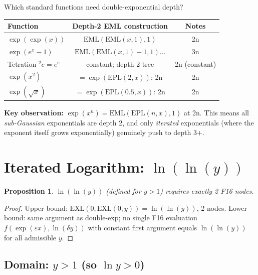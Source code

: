 \documentclass[11pt]{article}
\newtheorem{proposition}[theorem]{Proposition}
\begin{document}
Which standard functions need double-exponential depth?

\begin{center}
\begin{tabular}{lcc}
\toprule
Function & Depth-2 EML construction & Notes \\
\midrule
$\exp(\exp(x))$ & $\mathrm{EML}(\mathrm{EML}(x,1),1)$ & 2n \\
$\exp(e^x - 1)$ & $\mathrm{EML}(\mathrm{EML}(x,1)-1, 1)$... & 3n \\
Tetration ${}^2 e = e^e$ & constant; depth 2 tree & 2n (constant) \\
$\exp(x^2)$ & $= \exp(\mathrm{EPL}(2,x))$: 2n & 2n \\
$\exp(\sqrt{x})$ & $= \exp(\mathrm{EPL}(0.5,x))$: 2n & 2n \\
\bottomrule
\end{tabular}
\end{center}

\noindent \textbf{Key observation:} $\exp(x^n) = \mathrm{EML}(\mathrm{EPL}(n,x), 1)$ at 2n.
This means all \emph{sub-Gaussian} exponentials are depth 2, and only
\emph{iterated} exponentials (where the exponent itself grows exponentially) genuinely
push to depth 3+.

\section{Iterated Logarithm: $\ln(\ln(y))$}
\label{sec:iterated-log}

\begin{proposition}
$\ln(\ln(y))$ (defined for $y > 1$) requires exactly 2 F16 nodes.
\end{proposition}

\begin{proof}
Upper bound: $\mathrm{EXL}(0, \mathrm{EXL}(0, y)) = \ln(\ln(y))$, 2 nodes.
Lower bound: same argument as double-exp; no single F16 evaluation
$f(\exp(\varepsilon x), \ln(\delta y))$ with constant first argument equals $\ln(\ln(y))$
for all admissible $y$.
\end{proof}

\subsection{Domain: $y > 1$ (so $\ln y > 0$)}
\end{document}

